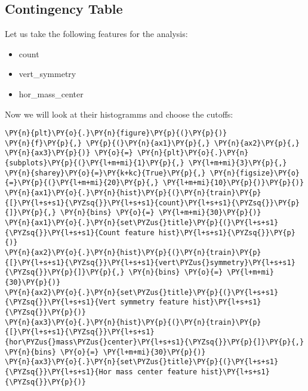 \subsection*{Contingency Table}

    Let us take the following features for the analysis:

\begin{itemize}
\item
  count
\item
  vert\_symmetry
\item
  hor\_mass\_center
\end{itemize}

Now we will look at their histogramms and choose the cutoffs:

    \begin{tcolorbox}[breakable, size=fbox, boxrule=1pt, pad at break*=1mm,colback=cellbackground, colframe=cellborder]
\begin{Verbatim}[commandchars=\\\{\}]
\PY{n}{plt}\PY{o}{.}\PY{n}{figure}\PY{p}{(}\PY{p}{)}
\PY{n}{f}\PY{p}{,} \PY{p}{(}\PY{n}{ax1}\PY{p}{,} \PY{n}{ax2}\PY{p}{,} \PY{n}{ax3}\PY{p}{)} \PY{o}{=} \PY{n}{plt}\PY{o}{.}\PY{n}{subplots}\PY{p}{(}\PY{l+m+mi}{1}\PY{p}{,} \PY{l+m+mi}{3}\PY{p}{,} \PY{n}{sharey}\PY{o}{=}\PY{k+kc}{True}\PY{p}{,} \PY{n}{figsize}\PY{o}{=}\PY{p}{(}\PY{l+m+mi}{20}\PY{p}{,} \PY{l+m+mi}{10}\PY{p}{)}\PY{p}{)}
\PY{n}{ax1}\PY{o}{.}\PY{n}{hist}\PY{p}{(}\PY{n}{train}\PY{p}{[}\PY{l+s+s1}{\PYZsq{}}\PY{l+s+s1}{count}\PY{l+s+s1}{\PYZsq{}}\PY{p}{]}\PY{p}{,} \PY{n}{bins} \PY{o}{=} \PY{l+m+mi}{30}\PY{p}{)}
\PY{n}{ax1}\PY{o}{.}\PY{n}{set\PYZus{}title}\PY{p}{(}\PY{l+s+s1}{\PYZsq{}}\PY{l+s+s1}{Count feature hist}\PY{l+s+s1}{\PYZsq{}}\PY{p}{)}
\PY{n}{ax2}\PY{o}{.}\PY{n}{hist}\PY{p}{(}\PY{n}{train}\PY{p}{[}\PY{l+s+s1}{\PYZsq{}}\PY{l+s+s1}{vert\PYZus{}symmetry}\PY{l+s+s1}{\PYZsq{}}\PY{p}{]}\PY{p}{,} \PY{n}{bins} \PY{o}{=} \PY{l+m+mi}{30}\PY{p}{)}
\PY{n}{ax2}\PY{o}{.}\PY{n}{set\PYZus{}title}\PY{p}{(}\PY{l+s+s1}{\PYZsq{}}\PY{l+s+s1}{Vert symmetry feature hist}\PY{l+s+s1}{\PYZsq{}}\PY{p}{)}
\PY{n}{ax3}\PY{o}{.}\PY{n}{hist}\PY{p}{(}\PY{n}{train}\PY{p}{[}\PY{l+s+s1}{\PYZsq{}}\PY{l+s+s1}{hor\PYZus{}mass\PYZus{}center}\PY{l+s+s1}{\PYZsq{}}\PY{p}{]}\PY{p}{,} \PY{n}{bins} \PY{o}{=} \PY{l+m+mi}{30}\PY{p}{)}
\PY{n}{ax3}\PY{o}{.}\PY{n}{set\PYZus{}title}\PY{p}{(}\PY{l+s+s1}{\PYZsq{}}\PY{l+s+s1}{Hor mass center feature hist}\PY{l+s+s1}{\PYZsq{}}\PY{p}{)}
\end{Verbatim}
\end{tcolorbox}

